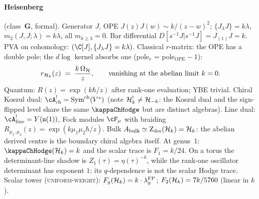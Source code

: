 \paragraph{Heisenberg} (class~$\mathbf{G}$, formal).
Generator $J$, OPE $J(z)J(w) \sim k/(z-w)^2$;
$\{J_\lambda J\} = k\lambda$, $m_2(J,J;\lambda) = k\lambda$, all
$m_{k\ge 3} = 0$. Bar differential
$D[s^{-1}J | s^{-1}J] = J_{(1)}J = k$. PVA on cohomology:
$(\C[J], \{J_\lambda J\} = k\lambda)$. Classical $r$-matrix:
the OPE has a double pole; the $d\log$ kernel absorbs one
(pole$_r$ = pole$_{\mathrm{OPE}} - 1$):
\[
r_{\mathcal{H}_k}(z) \;=\; \frac{k\,\Omega_{\mathcal{H}}}{z},
\qquad\text{vanishing at the abelian limit $k = 0$.}
\]
Quantum: $R(z) = \exp(k\hbar/z)$ after rank-one evaluation; YBE trivial.
Chiral Koszul dual:
$\cA^!_{\mathrm{ch}} = \mathrm{Sym}^{\mathrm{ch}}(V^*)$
(note $\mathcal{H}_k^! \neq \mathcal{H}_{-k}$: the Koszul dual and the sign-flipped
level share the same $\kappaChHodge$ but are distinct
algebras). Line dual:
$\cA^!_{\mathrm{line}} = Y(\mathfrak{u}(1))$, Fock modules
$\cF_\mu$ with braiding
$R_{\mu_1,\mu_2}(z) = \exp(k\mu_1\mu_2\hbar/z)$.
Bulk $A_{\mathrm{bulk}} \simeq \operatorname{Z}_{\mathrm{der}}(\mathcal{H}_k) = \mathcal{H}_k$: the abelian derived centre
is the boundary chiral algebra itself.
At genus~$1$: $\kappaChHodge(\cH_k) = k$ and the scalar trace is
$F_1=k/24$. On a torus the determinant-line shadow is
$Z_1(\tau)=\eta(\tau)^{-k}$, while the rank-one oscillator
determinant has exponent $1$; its $q$-dependence is not the scalar
Hodge trace. Scalar tower
\textup{(\textsc{uniform-weight})}:
$F_g(\mathcal{H}_k) = k\cdot\lambda_g^{\mathrm{FP}}$;
$F_2(\mathcal{H}_k) = 7k/5760$ (linear in $k$).

